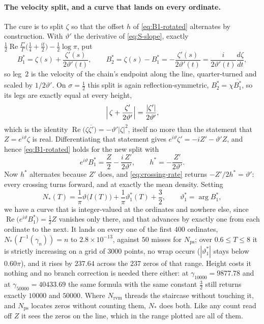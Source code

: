 \documentclass[11pt]{article}
\theoremstyle{definition}
\begin{document}
\paragraph{The velocity split, and a curve that lands on every ordinate.} The
cure is to split $\zeta$ so that the offset $h$ of \eqref{eq:B1-rotated}
alternates by construction. With $\vartheta'$ the derivative of \eqref{eq:S-slope}, exactly
$\tfrac12\operatorname{Re}\tfrac{\Gamma'}{\Gamma}\bigl(\tfrac14+\tfrac{it}{2}\bigr)-\tfrac12\log\pi$,
put
\begin{equation}\label{eq:vel-split}
B_1^{\ast}=\zeta(s)+\frac{\zeta'(s)}{2\vartheta'(t)},\qquad
B_2^{\ast}=\zeta(s)-B_1^{\ast}=-\frac{\zeta'(s)}{2\vartheta'(t)}
=\frac{i}{2\vartheta'(t)}\frac{d\zeta}{dt},
\end{equation}
so leg~2 is the velocity of the chain's endpoint along the line, quarter-turned
and scaled by $1/2\vartheta'$. On $\sigma=\tfrac12$ this split is again
reflection-symmetric, $B_2^{\ast}=\chi\overline{B_1^{\ast}}$, so its legs are
exactly equal at every height,
\begin{equation}\label{eq:vel-legs}
\Bigl|\,\zeta+\frac{\zeta'}{2\vartheta'}\Bigr|=\frac{|\zeta'|}{2\vartheta'},
\end{equation}
which is the identity $\operatorname{Re}\bigl(\zeta\overline{\zeta'}\bigr)
=-\vartheta'|\zeta|^{2}$, itself no more than the statement that
$Z=e^{i\vartheta}\zeta$ is real. Differentiating that statement gives
$e^{i\vartheta}\zeta'=-iZ'-\vartheta'Z$, and hence \eqref{eq:B1-rotated} holds for the
new split with
\begin{equation}\label{eq:h-star}
e^{i\vartheta}B_1^{\ast}=\frac{Z}{2}-\frac{i\,Z'}{2\vartheta'},
\qquad h^{\ast}=-\frac{Z'}{2\vartheta'} .
\end{equation}
Now $h^{\ast}$ alternates because $Z'$ does, and \eqref{eq:crossing-rate}
returns $-Z'/2h^{\ast}=\vartheta'$: every crossing turns forward, and at exactly
the mean density. Setting
\begin{equation}\label{eq:N-star}
N_{\ast}(T)=\frac{1}{\pi}\vartheta\bigl(I(T)\bigr)
+\frac{1}{\pi}\vartheta_1^{\ast}(T)+\frac32,
\qquad \vartheta_1^{\ast}=\arg B_1^{\ast},
\end{equation}
we have a curve that is integer-valued at the ordinates and nowhere else, since
$\operatorname{Re}\bigl(e^{i\vartheta}B_1^{\ast}\bigr)=\tfrac12Z$ vanishes only
there, and that advances by exactly one from each ordinate to the next. It lands
on every one of the first $400$ ordinates, $N_{\ast}(I^{-1}(\gamma_n))=n$ to
$2.8\times10^{-13}$, against $50$ misses for $N_{\mathrm{ps}}$; over
$0.6\leq T\leq8$ it is strictly increasing on a grid of $3000$ points, no wrap
occurs ($|\vartheta_1^{\ast}|$ stays below $0.60\pi$), and it rises by $237.64$
across the $237$ zeros of that range. Height costs it nothing and no branch
correction is needed there either: at $\gamma_{10000}=9877.78$ and at
$\gamma_{50000}=40433.69$ the same formula with the same constant $\tfrac32$
still returns exactly $10000$ and $50000$. Where $N_{\mathrm{rvm}}$ threads the
staircase without touching it, and $N_{\mathrm{ps}}$ locates zeros without
counting them, $N_{\ast}$ does both. Like any count read off $Z$ it sees the
zeros on the line, which in the range plotted are all of them.
\end{document}
